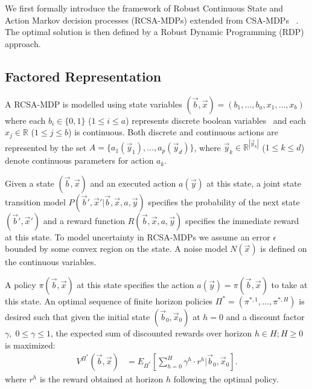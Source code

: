 We first formally introduce the framework of Robust Continuous State and Action Markov decision processes (RCSA-MDPs) extended from CSA-MDPs ~\cite{sdp_aaai}. The optimal solution is then defined by a Robust Dynamic Programming (RDP) approach. 
\subsection{Factored Representation}

A RCSA-MDP is modelled using state variables $(\vec{b},\vec{x}) = ( b_1,\ldots,b_a,x_{1},\ldots,x_b )$ where each $b_i \in \{ 0,1 \}$ ($1 \leq i \leq a$) represents discrete boolean variables $\,$
and each $x_j \in \mathbb{R}$ ($1 \leq j \leq b$) is continuous.  
Both discrete and continuous actions are represented by the set $A = \{a_1(\vec{y}_1), \ldots, a_p(\vec{y}_d) \}$, where  $\vec{y}_k \in \mathbb{R}^{|\vec{y}_k|}$ ($1\leq k \leq d$) denote continuous parameters for action $a_k$.

Given a state $(\vec{b},\vec{x})$ and an executed action $a(\vec{y})$ at this state, a joint state transition model
$P(\vec{b}',\vec{x}'| \vec{b},\vec{x},a,\vec{y})$ specifies the probability of the next state $(\vec{b}',\vec{x}')$ and a
reward function $R(\vec{b},\vec{x},a,\vec{y})$ specifies the immediate reward at this state.  To model uncertainty in RCSA-MDPs we assume an error $\epsilon$ bounded by some convex region on the state. A noise model $N(\vec{x})$ is defined on the continuous variables. 

A policy $\pi(\vec{b},\vec{x})$ at this state specifies the action $a(\vec{y}) =
\pi(\vec{b},\vec{x})$ to take at this state.  An optimal sequence of finite horizon policies $\Pi^* = (\pi^{*,1},\ldots,\pi^{*,H})$ is desired such that given the initial state $(\vec{b}_0,\vec{x}_0)$ at $h=0$ and  a discount factor $\gamma, \; 0 \leq \gamma \leq 1$, the expected sum of discounted rewards over horizon $h \in H ;H \geq 0$ is maximized: 
\begin{align}
V^{\Pi^*}(\vec{b},\vec{x}) & = E_{\Pi^*} \left[ \sum_{h=0}^{H} \gamma^h \cdot r^h \Big| \vec{b}_0,\vec{x}_0\right].
\end{align}
where $r^h$ is the reward obtained at horizon $h$ following the optimal policy. 

